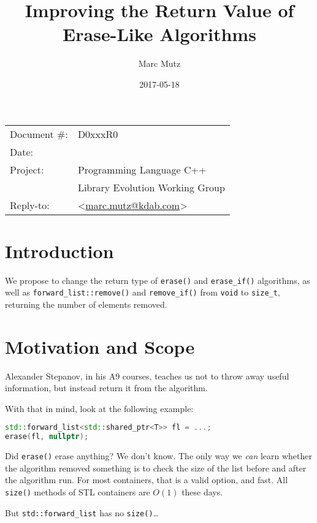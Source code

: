 \documentclass[11pt]{article}
\date{}
\title{Improving the Return Value of Erase-Like Algorithms}
\makeatletter
\newcommand{\emailaddress}{marc.mutz@kdab.com}
\newcommand{\email}{\href{mailto:\emailaddress}{\emailaddress}}
\makeatother
\begin{document}
\maketitle\vspace{-2cm}

\begin{flushright}
  \begin{tabular}{ll}
  Document \#:&D0xxxR0\\
  Date:       &\date{2017-05-18}\\
  Project:    &Programming Language C++\\
              &Library Evolution Working Group\\
  Reply-to:   &\author{Marc Mutz} \textless\email\textgreater
  \end{tabular}
\end{flushright}

\section{Introduction}

We propose to change the return type of \cite{LFv2TS} \texttt{erase()}
and \texttt{erase\_if()} algorithms, as well as
\texttt{forward\_list::remove()} and \texttt{remove\_if()} from
\texttt{void} to \texttt{size\_t}, returning the number of elements
removed.

\section{Motivation and Scope}

Alexander Stepanov, in his A9 courses\cite{A9}, teaches us not to
throw away useful information, but instead return it from the
algorithm.

With that in mind, look at the following example:
\begin{lstlisting}[language=C++]
std::forward_list<std::shared_ptr<T>> fl = ...;
erase(fl, nullptr);
\end{lstlisting}
Did \texttt{erase()} erase anything? We don't know. The only way we
\emph{can} learn whether the algorithm removed something is to check
the size of the list before and after the algorithm run. For most
containers, that is a valid option, and fast. All \texttt{size()}
methods of STL containers are $O(1)$ these days.

But \texttt{std::forward\_list} has no \texttt{size()}\ldots
\end{document}

